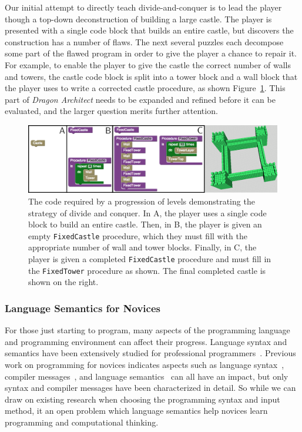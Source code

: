 \documentclass{sig-alternate}
\newcommand{\gametitle}{{\emph{Dragon Architect}}}
\begin{document}
Our initial attempt to directly teach divide-and-conquer is to lead the player though a top-down deconstruction of building a large castle.
The player is presented with a single code block that builds an entire castle, but discovers the construction has a number of flaws. 
The next several puzzles each decompose some part of the flawed program in order to give the player a chance to repair it. 
For example, to enable the player to give the castle the correct number of walls and towers, the castle code block is split into a tower block and a wall block that the player uses to write a corrected castle procedure, as shown Figure~\ref{fig:decomp}. 
This part of \gametitle{} needs to be expanded and refined before it can be evaluated, and the larger question merits further attention. 

\begin{figure}[th!]
  \centering
  \includegraphics[width=\textwidth]{images/decomp-code}
  \caption{The code required by a progression of levels demonstrating the strategy of divide and conquer. In A, the player uses a single code block to build an entire castle. Then, in B, the player is given an empty \texttt{FixedCastle} procedure, which they must fill with the appropriate number of wall and tower blocks. Finally, in C, the player is given a completed \texttt{FixedCastle} procedure and must fill in the \texttt{FixedTower} procedure as shown. The final completed castle is shown on the right.}
  \label{fig:decomp}
\end{figure}

\subsubsection{Language Semantics for Novices}

For those just starting to program, many aspects of the programming language and programming environment can affect their progress. 
Language syntax and semantics have been extensively studied for professional programmers~\cite{hudak1994haskell, kennedy2004defining, delorey2007programming}.
Previous work on programming for novices indicates aspects such as language syntax~\cite{stefik2013syntax}, compiler messages~\cite{nienaltowski2008compiler}, and language semantics~\cite{hoc1990language} can all have an impact, but only syntax and compiler messages have been characterized in detail. 
So while we can draw on existing research when choosing the programming syntax and input method, it an open problem which language semantics help novices learn programming and computational thinking.
\end{document}
